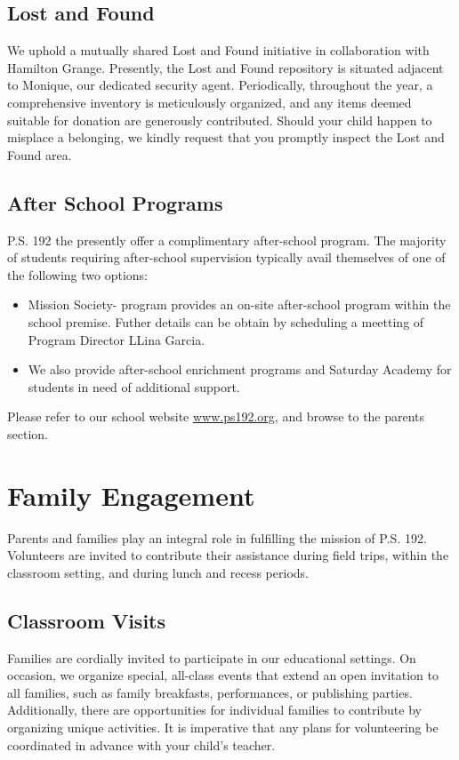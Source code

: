 \documentclass[11pt, letterpaper]{article}
\begin{document}
\subsection{Lost and Found}
We uphold a mutually shared Lost and Found initiative in collaboration with Hamilton Grange. Presently, the Lost and Found repository is situated adjacent to Monique, our dedicated security agent. Periodically, throughout the year, a comprehensive inventory is meticulously organized, and any items deemed suitable for donation are generously contributed. Should your child happen to misplace a belonging, we kindly request that you promptly inspect the Lost and Found area.

\subsection{After School Programs}
P.S. 192 the presently offer a complimentary after-school program. The majority of students requiring after-school supervision typically avail themselves of one of the following two options:
\begin{itemize}
  \item Mission Society- program provides an on-site after-school program within the school premise. Futher details can be obtain by scheduling a meetting of Program Director LLina Garcia.
  \item We also provide after-school enrichment programs and Saturday Academy for students in need of additional support.
\end{itemize}
Please refer to our school website \href{https:www.ps192.org}{www.ps192.org}, and browse to the parents section.

\section{Family Engagement}
Parents and families play an integral role in fulfilling the mission of P.S. 192. Volunteers are invited to contribute their assistance during field trips, within the classroom setting, and during lunch and recess periods.

\subsection{Classroom Visits}
Families are cordially invited to participate in our educational settings. On occasion, we organize special, all-class events that extend an open invitation to all families, such as family breakfasts, performances, or publishing parties. Additionally, there are opportunities for individual families to contribute by organizing unique activities. It is imperative that any plans for volunteering be coordinated in advance with your child's teacher.
\end{document}

